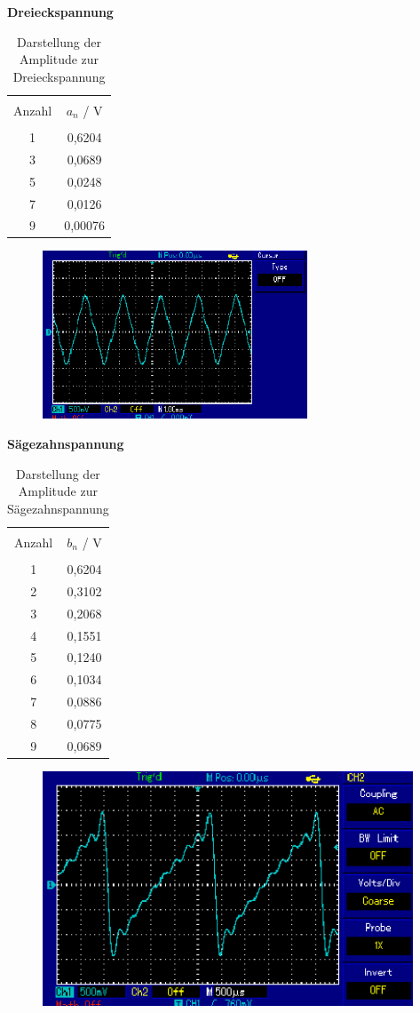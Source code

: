 \centerline{\textbf{Dreieckspannung}}
\begin{table}[H]
  \centering
  \begin{tabular}{c c}
    \toprule\\
    Anzahl & $a_n$ / V \\
    \midrule \\
    1 & 0,6204 \\
    3 & 0,0689 \\
    5 & 0,0248 \\
    7 & 0,0126 \\
    9 & 0,00076 \\
    \bottomrule
  \end{tabular}
  \caption{Darstellung der Amplitude zur Dreieckspannung}
  \label{tab:5}
\end{table}
\begin{figure}[H]
  \centering
	\includegraphics[width=10 cm , height=5cm]{Dreieckspannung/4.png}
\end{figure}
\centerline{\textbf{Sägezahnspannung}}
\begin{table}[H]
  \centering
  \begin{tabular}{c c}
    \toprule\\
    Anzahl & $b_n$ / V \\
    \midrule \\
    1 & 0,6204 \\
    2 & 0,3102 \\
    3 & 0,2068 \\
    4 & 0,1551 \\
    5 & 0,1240 \\
    6 & 0,1034 \\
    7 & 0,0886 \\
    8 & 0,0775 \\
    9 & 0,0689 \\
    \bottomrule
  \end{tabular}
  \caption{Darstellung der Amplitude zur Sägezahnspannung}
  \label{tab:6}
\end{table}
\begin{figure}[H]
  \centering
	\includegraphics[width=10 cm , height=7cm]{Saegespannung/8.png}
\end{figure}
